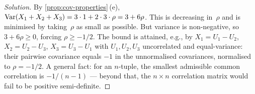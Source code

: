 \begin{proof}[Solution]
By \cref{prop:cov-properties}\,(e),
$\operatorname{Var}(X_1 + X_2 + X_3) = 3 \cdot 1 + 2 \cdot 3 \cdot \rho = 3 + 6\rho$.
This is decreasing in~$\rho$ and is minimised by taking~$\rho$ as
small as possible. But variance is non-negative, so $3 + 6\rho \geq 0$,
forcing $\rho \geq -1/2$. The bound is attained, e.g., by
$X_1 = U_1 - U_2$, $X_2 = U_2 - U_3$, $X_3 = U_3 - U_1$ with
$U_1, U_2, U_3$ uncorrelated and equal-variance: their pairwise
covariance equals $-1$ in the unnormalised covariances, normalised to
$\rho = -1/2$. A general fact: for an $n$-tuple, the smallest
admissible common correlation is $-1/(n - 1)$ — beyond that, the
$n \times n$ correlation matrix would fail to be positive semi-definite.
\end{proof}
